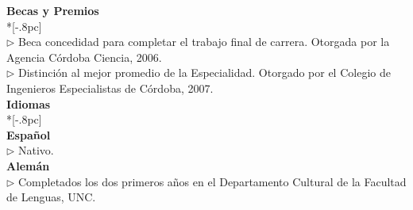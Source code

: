 \documentclass[a4paper,11pt,english]{article}
\begin{document}
{\bf Becas y Premios} \\*[-.8pc]
\underline{\hspace{6in}} \\
$\triangleright$ Beca concedidad para completar el trabajo final de carrera.
Otorgada por la Agencia C\'ordoba Ciencia, 2006.\\ 
$\triangleright$ Distinci\'on al mejor promedio de la Especialidad.
Otorgado por el Colegio de Ingenieros Especialistas de C\'ordoba, 2007.\\

{\large \bf Idiomas} \\*[-.8pc]
\underline{\hspace{6in}} \\

{\bf Espa\~{n}ol}\\
$\triangleright$ Nativo.
\\

{\bf Alem\'an}\\
$\triangleright$ Completados los dos primeros a\~{n}os en el Departamento Cultural de la Facultad de Lenguas, UNC. 

 \\
\end{document}
